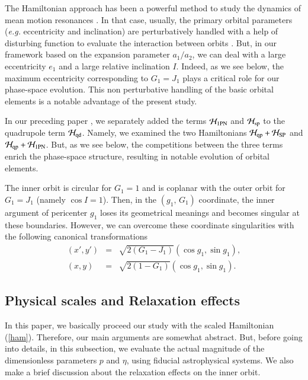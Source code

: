 \documentclass[useAMS,usenatbib,twocolumn]{mn2e}
\newcommand{\beqa}{\begin{eqnarray}}
\newcommand{\eeqa}{\end{eqnarray}}
\begin{document}
The Hamiltonian approach has been a powerful method to study the dynamics of mean motion resonances  \citep{henrard1982,borderies1984,ssd}. In that case, usually, the primary orbital parameters ({\it e.g.} eccentricity and inclination) are perturbatively handled with a help of disturbing function to evaluate the interaction between orbits \citep{ssd}. But, in our framework based on the expansion parameter $a_1/a_2$, we can  deal with a large eccentricity $e_1$ and a large relative inclination $I$.  Indeed, as we see below, the maximum eccentricity corresponding to $G_1=J_1$ plays a critical role for our phase-space evolution. This non perturbative handling of the basic orbital elements is a notable advantage of the present study. 

In our preceding paper \cite{iwasa2016}, we separately added the terms  $\mathcal{H}_{\rm 1PN}$ and  $\mathcal{H}_{\rm sp}$ to the quadrupole term  $\mathcal{H}_{\rm qd}$. Namely, we examined the two Hamiltonians $\mathcal{H}_{\rm qp}+\mathcal{H}_{\rm SP}$  and $\mathcal{H}_{\rm
qp}+\mathcal{H}_{\rm 1PN}$.  But, as we see below, the competitions between the three terms enrich the phase-space structure, resulting in notable evolution of orbital elements. 



The inner orbit is circular for $G_1=1$ and is coplanar with the
outer orbit for $G_1=J_1$ (namely $\cos I=1$). Then, in the
$(g_1,\, G_1)$ coordinate, the inner argument of pericenter
$g_1$ loses its geometrical meanings and becomes singular at
these boundaries. However, we can overcome these coordinate
singularities with the following canonical transformations
\citep{2005MNRAS.358.1361I}
\beqa
(x', y')&=&\sqrt{2(G_{1}-J_{1})}(\cos g_{1}, \sin g_{1}),\\
(x, y)&=&\sqrt{2(1-G_{1})}(\cos g_{1}, \sin g_{1}).
\eeqa
\fi%


\subsection{Physical scales and Relaxation effects}




In this paper, we basically proceed our study with the
scaled Hamiltonian (\ref{ham}). Therefore, our main arguments
are somewhat abstract.
But, before going into details, in this subsection, we evaluate
the actual magnitude of the dimensionless parameters $p$ and
$\eta$, using fiducial astrophysical systems. We also make a brief
discussion about the relaxation effects on the inner orbit.
\end{document}
